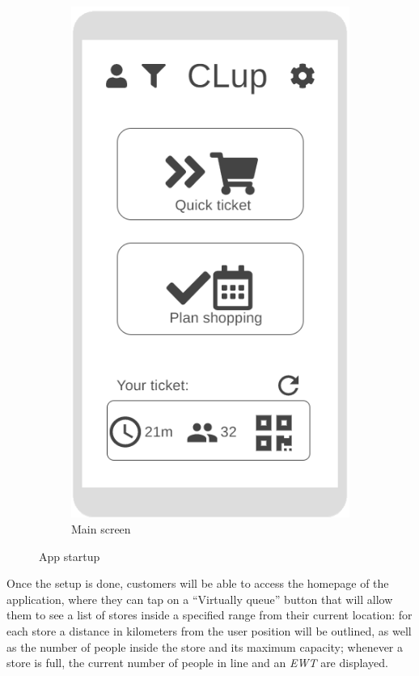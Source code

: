 \begin{figure}[h!]
\begin{subfigure}[b]{0.3\textwidth}
		\includegraphics[width=\linewidth]{../Diagrams/WireframesCLup/MainScreen.png}
		\caption{Main screen}
		\label{fig:WfMain}
	\end{subfigure}
	\caption{App startup}
	\label{fig:Wireframes}
\end{figure}
Once the setup is done, customers will be able to access the homepage of the application, where they can tap on a “Virtually queue” button that will allow them to see a list of stores inside a specified range from their current location: for each store a distance in kilometers from the user position will be outlined, as well as the number of people inside the store and its maximum capacity; whenever a store is full, the current number of people in line and an \textit{EWT} are displayed.\newline  
